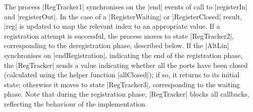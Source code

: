 The process |RegTracker1| synchronises on the |end| events of call to
|registerIn| and |registerOut|.  In the case of a |RegisterWaiting| or
|RegisterClosed| result, |reg| is updated to map the relevant index to an
appropriate value.
%
If a registration attempt is successful, the process moves to state
|RegTracker2|, corresponding to the deregistration phase, described below.  If
the |AltLin| synchronises on |endRegistration|, indicating the end of the
registration phase, the |RegTracker| sends a value indicating whether all the
ports have been closed (calculated using the helper function |allClosed|); if
so, it returns to its initial state; otherwise it moves to state
|RegTracker3|, corresponding to the waiting phase.
%
Note that during the registration phase, |RegTracker| blocks all callbacks,
reflecting the behaviour of the implementation. 





